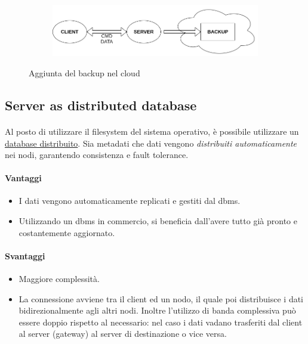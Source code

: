 \documentclass[11pt,a4paper,english]{article}
\begin{document}
\begin{figure}[H]
	\centering
	\begin{subfigure}{0.80\linewidth}
		\includegraphics[width=\linewidth]{../diagrams/architettura/3.png}
	\end{subfigure}
	\caption{Aggiunta del backup nel cloud}
\end{figure}



\subsection{Server as distributed database}

\paragraph{} Al posto di utilizzare il filesystem del sistema operativo, è possibile utilizzare un \underline{database distribuito}\cite{ddbms}. Sia metadati che dati vengono \emph{distribuiti automaticamente} nei nodi, garantendo consistenza e fault tolerance. 


\paragraph{Vantaggi} \begin{itemize}
	\item I dati vengono automaticamente replicati e gestiti dal dbms.
	\item Utilizzando un dbms in commercio, si beneficia dall'avere tutto già pronto e costantemente aggiornato.
\end{itemize}


\paragraph{Svantaggi} \begin{itemize}
	\item Maggiore complessità.
	\item La connessione avviene tra il client ed un nodo, il quale poi distribuisce i dati bidirezionalmente agli altri nodi. Inoltre l'utilizzo di banda complessiva può essere doppio rispetto al necessario: nel caso i dati vadano trasferiti dal client al server (gateway) al server di destinazione o vice versa. 
\end{itemize}
\end{document}

